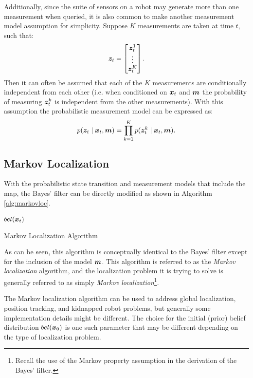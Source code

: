 Additionally, since the suite of sensors on a robot may generate more than one measurement when queried, it is also common to make another measurement model assumption for simplicity. Suppose $K$ measurements are taken at time $t$, such that:
\begin{equation*}
    \bm{z}_t = \begin{bmatrix}
    \bm{z}_t^1 \\ \vdots \\ \bm{z}_t^K
    \end{bmatrix}.
\end{equation*}
Then it can often be assumed that each of the $K$ measurements are conditionally independent from each other (i.e. when conditioned on $\bm{x}_t$ and $\bm{m}$ the probability of measuring $\bm{z}_t^k$ is independent from the other measurements). With this assumption the probabilistic measurement model can be expressed as:
\begin{equation} \label{eq:condind}
    p(\bm{z}_{t} \mid \bm{x}_{t}, \bm{m}) = \prod_{k=1}^{K}p(\bm{z}_{t}^{k}\mid \bm{x}_{t}, \bm{m}).
\end{equation}

\subsection{Markov Localization}
With the probabilistic state transition and measurement models that include the map, the Bayes' filter can be directly modified as shown in Algorithm \ref{alg:markovloc}.
\begin{algorithm}[ht]
 \Return $bel(\bm{x}_{t})$
 \caption{Markov Localization Algorithm}
 \label{alg:markovloc}
\end{algorithm}
As can be seen, this algorithm is conceptually identical to the Bayes' filter except for the inclusion of the model $\bm{m}$. This algorithm is referred to as the \textit{Markov localization} algorithm, and the localization problem it is trying to solve is generally referred to as simply \textit{Markov localization}\footnote{Recall the use of the Markov property assumption in the derivation of the Bayes' filter.}. 

The Markov localization algorithm can be used to address global localization, position tracking, and kidnapped robot problems, but generally some implementation details might be different. The choice for the initial (prior) belief distribution $bel(\bm{x}_0)$ is one such parameter that may be different depending on the type of localization problem.

